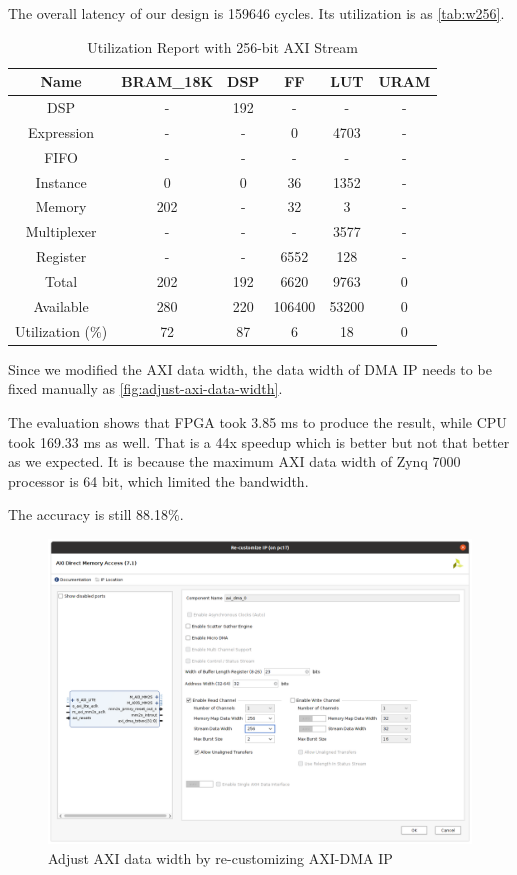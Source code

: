 The overall latency of our design is 159646 cycles.
Its utilization is as \autoref{tab:w256}.

\begin{table}[ht!]
    \centering
    \caption{Utilization Report with 256-bit AXI Stream}\label{tab:w256}
    \begin{tabular}{cccccc}
        \toprule
        Name             & BRAM\_18K & DSP & FF     & LUT   & URAM \\
        \midrule
        DSP              & -         & 192 & -      & -     & -    \\
        Expression       & -         & -   & 0      & 4703  & -    \\
        FIFO             & -         & -   & -      & -     & -    \\
        Instance         & 0         & 0   & 36     & 1352  & -    \\
        Memory           & 202       & -   & 32     & 3     & -    \\
        Multiplexer      & -         & -   & -      & 3577  & -    \\
        Register         & -         & -   & 6552   & 128   & -    \\
        \midrule
        Total            & 202       & 192 & 6620   & 9763  & 0    \\
        \midrule
        Available        & 280       & 220 & 106400 & 53200 & 0    \\
        \midrule
        Utilization (\%) & 72        & 87  & 6      & 18    & 0    \\
        \bottomrule
    \end{tabular}
\end{table}

Since we modified the AXI data width, the data width of DMA IP needs to be fixed manually as \autoref{fig:adjust-axi-data-width}.

The evaluation shows that FPGA took 3.85 ms to produce the result, while CPU took 169.33 ms as well.
That is a 44x speedup which is better but not that better as we expected.
It is because the maximum AXI data width of Zynq 7000 processor is 64 bit, which limited the bandwidth.

The accuracy is still 88.18\%.

\begin{figure}[ht!]
    \centering
    \caption{Adjust AXI data width by re-customizing AXI-DMA IP}
    \label{fig:adjust-axi-data-width}
    \includegraphics[scale=0.32]{images/adjust-axi-data-width.png}
\end{figure}


